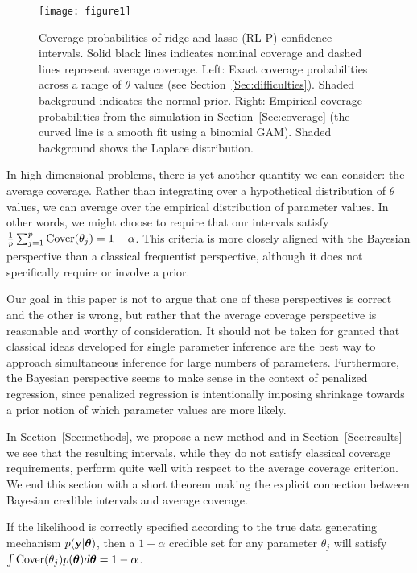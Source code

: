 \begin{figure}[htb!]
  \begin{center}
    \texttt{[image: figure1]}
    \caption{\label{Fig:laplace}
      Coverage probabilities of ridge and lasso (RL-P) confidence intervals. Solid black lines indicates nominal coverage and dashed lines represent average coverage. Left: Exact coverage probabilities across a range of $\theta$ values (see Section~\ref{Sec:difficulties}). Shaded background indicates the normal prior. Right: Empirical coverage probabilities from the simulation in Section~\ref{Sec:coverage} (the curved line is a smooth fit using a binomial GAM). Shaded background shows the Laplace distribution.}
  \end{center}
\end{figure}

In high dimensional problems, there is yet another quantity we can consider: the average coverage. Rather than integrating over a hypothetical distribution of $\theta$ values, we can average over the empirical distribution of parameter values. In other words, we might choose to require that our intervals satisfy $\tfrac{1}{p} \sum_{j=1}^p \textrm{Cover}(\theta_j) = 1-\alpha$. This criteria is more closely aligned with the Bayesian perspective than a classical frequentist perspective, although it does not specifically require or involve a prior.

Our goal in this paper is not to argue that one of these perspectives is correct and the other is wrong, but rather that the average coverage perspective is reasonable and worthy of consideration. It should not be taken for granted that classical ideas developed for single parameter inference are the best way to approach simultaneous inference for large numbers of parameters. Furthermore, the Bayesian perspective seems to make sense in the context of penalized regression, since penalized regression is intentionally imposing shrinkage towards a prior notion of which parameter values are more likely.

In Section~\ref{Sec:methods}, we propose a new method and in Section~\ref{Sec:results} we see that the resulting intervals, while they do not satisfy classical coverage requirements, perform quite well with respect to the average coverage criterion. We end this section with a short theorem making the explicit connection between Bayesian credible intervals and average coverage.

\begin{thm}
  \label{Thm:bcc}
  If the likelihood is correctly specified according to the true data generating mechanism $p(\mathbf{y} | \boldsymbol{\theta})$, then a $1-\alpha$ credible set for any parameter $\theta_j$ will satisfy $\int \textrm{Cover}(\theta_j)p(\boldsymbol{\theta}) d\boldsymbol{\theta} = 1 - \alpha$.
\end{thm}

